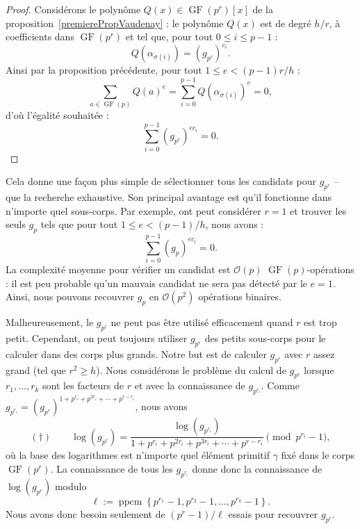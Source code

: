 \documentclass[a4paper, titlepage, 11pt]{article}
\theoremstyle{definition}
\theoremstyle{remark}
\def\O{\mathcal O}
\def\gf{\operatorname{GF}}
\def\ppcm{\operatorname{ppcm}}
\begin{document}
\begin{proof}
Considérons le polynôme $Q(x)\in\gf(p^r)[x]$ de la proposition~\ref{premierePropVaudenay} : le polynôme $Q(x)$ est de degré $h/r$, à coefficients dans $\gf(p^r)$ et tel que, pour tout $0 \leqslant i \leqslant p-1$ :
$$Q\left(\alpha_{\sigma(i)}\right) = (g_{p^r})^{c_i}.$$
Ainsi par la proposition précédente, pour tout $1 \leqslant e < (p-1)r/h$ :
$$\sum_{a\in\gf(p)} Q(a)^e = \sum_{i=0}^{p-1} Q\left(\alpha_{\sigma(i)}\right)^e = 0,$$
d'où l'égalité souhaitée :
$$\sum_{i=0}^{p-1} (g_{p^r})^{ec_i} = 0.$$
\end{proof}

Cela donne une façon plus simple de sélectionner tous les candidats pour $g_{p^r}$ -- que la recherche exhaustive. Son principal avantage est qu'il fonctionne dans n'importe quel sous-corps. Par exemple, ont peut considérer $r=1$ et trouver les seuls $g_p$ tels que pour tout $1 \leqslant e < (p-1)/h$, nous avons :
$$\sum_{i=0}^{p-1} (g_p)^{ec_i} = 0.$$
La complexité moyenne pour vérifier un candidat est $\O(p)$ $\gf(p)$-opérations : il est peu probable qu'un mauvais candidat ne sera pas détecté par le $e = 1$. Ainsi, nous pouvons recouvrer $g_p$ en $\O(p^2)$ opérations binaires.

Malheureusement, le $g_{p^r}$ ne peut pas être utilisé efficacement quand $r$ est trop petit. Cependant, on peut toujours utiliser $g_{p^r}$ des petits sous-corps pour le calculer dans des corps plus grands. Notre but est de calculer $g_{p^r}$ avec $r$ assez grand (tel que $r^2 \geqslant h$). Nous considérons le problème du calcul de $g_{p^r}$ lorsque $r_1,\dots,r_k$ sont les facteurs de $r$ et avec la connaissance de $g_{p^{r_i}}$. Comme $g_{p^{r_i}} = (g_{p^r})^{1+p^{r_i}+p^{2r_i}+\cdots+p^{r-r_i}}$, nous avons 
$$(\dagger)\qquad\log(g_{p^r}) = \frac{\log(g_{p^{r_i}})}{1+p^{r_i}+p^{2r_i}+p^{3r_i}+\cdots+p^{r-r_i}} \pmod{p^{r_i}-1},$$
où la base des logarithmes est n'importe quel élément primitif $\gamma$ fixé dans le corps $\gf(p^r)$. La connaissance de tous les $g_{p^{r_i}}$ donne donc la connaissance de $\log(g_{p^r})$ modulo
$$\ell := \ppcm \left\{p^{r_1} - 1, p^{r_2}-1, \dots, p^{r_k} -1\right\}.$$
Nous avons donc besoin seulement de $(p^r-1)/\ell$ essais pour recouvrer $g_{p^r}$.
\end{document}
